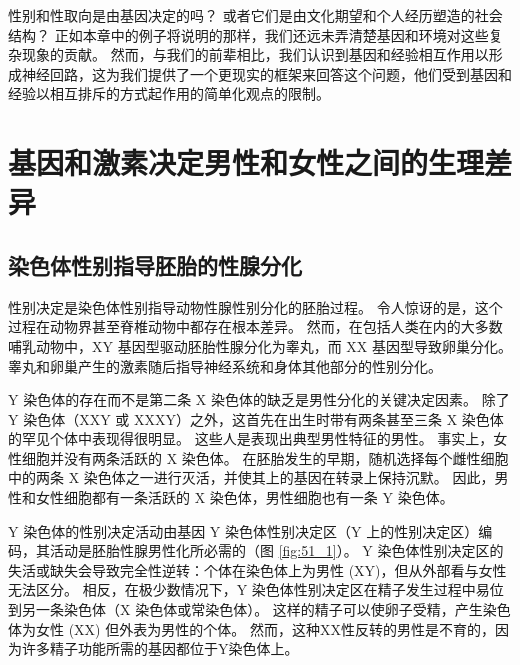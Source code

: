 性别和性取向是由基因决定的吗？
或者它们是由文化期望和个人经历塑造的社会结构？
正如本章中的例子将说明的那样，我们还远未弄清楚基因和环境对这些复杂现象的贡献。
然而，与我们的前辈相比，我们认识到基因和经验相互作用以形成神经回路，这为我们提供了一个更现实的框架来回答这个问题，他们受到基因和经验以相互排斥的方式起作用的简单化观点的限制。



\section{基因和激素决定男性和女性之间的生理差异}

\subsection{染色体性别指导胚胎的性腺分化}

性别决定是染色体性别指导动物性腺性别分化的胚胎过程。
令人惊讶的是，这个过程在动物界甚至脊椎动物中都存在根本差异。
然而，在包括人类在内的大多数哺乳动物中，XY 基因型驱动胚胎性腺分化为睾丸，而 XX 基因型导致卵巢分化。
睾丸和卵巢产生的激素随后指导神经系统和身体其他部分的性别分化。


Y 染色体的存在而不是第二条 X 染色体的缺乏是男性分化的关键决定因素。
除了 Y 染色体（XXY 或 XXXY）之外，这首先在出生时带有两条甚至三条 X 染色体的罕见个体中表现得很明显。
这些人是表现出典型男性特征的男性。
事实上，女性细胞并没有两条活跃的 X 染色体。 在胚胎发生的早期，随机选择每个雌性细胞中的两条 X 染色体之一进行灭活，并使其上的基因在转录上保持沉默。
因此，男性和女性细胞都有一条活跃的 X 染色体，男性细胞也有一条 Y 染色体。


Y 染色体的性别决定活动由基因 Y 染色体性别决定区（Y 上的性别决定区）编码，其活动是胚胎性腺男性化所必需的（图 \ref{fig:51_1}）。
Y 染色体性别决定区的失活或缺失会导致完全性逆转：个体在染色体上为男性 (XY)，但从外部看与女性无法区分。
相反，在极少数情况下，Y 染色体性别决定区在精子发生过程中易位到另一条染色体（X 染色体或常染色体）。
这样的精子可以使卵子受精，产生染色体为女性 (XX) 但外表为男性的个体。
然而，这种XX性反转的男性是不育的，因为许多精子功能所需的基因都位于Y染色体上。



